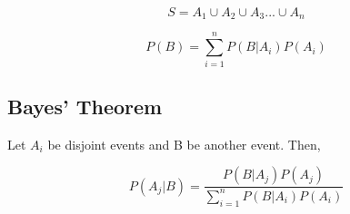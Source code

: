 \begin{equation}
  S = A_1 \cup A_2 \cup A_3... \cup A_n
\end{equation}

\begin{equation}
  P(B) = \sum^n_{i=1}P(B|A_i)P(A_i)
\end{equation}

\subsection{Bayes' Theorem} %
\label{sub:bayes_theorem}

Let $A_i$ be disjoint events and B be another event. Then,

\begin{equation}
  P(A_j|B) = \frac{P(B|A_j)P(A_j)}{\sum_{i=1}^nP(B|A_i)P(A_i)}
\end{equation}

